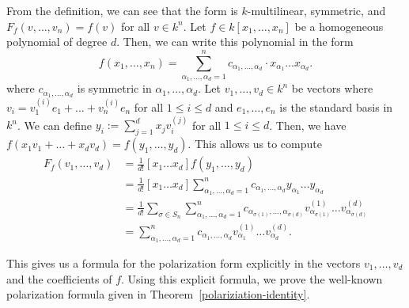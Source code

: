 \documentclass{puthesis-UG}
\begin{document}
From the definition, we can see that the form is $k$-multilinear, symmetric, and $F_f(v, \ldots, v_n) = f(v)$ for all $v \in k^n$. Let $f \in k[x_1, \ldots, x_n]$ be a homogeneous polynomial of degree $d$. Then, we can write this polynomial in the form 
\[
	f(x_1, \ldots, x_n) = \sum_{\alpha_1, \ldots, \alpha_d = 1}^n c_{\alpha_1, \ldots, \alpha_d} \cdot x_{\alpha_1} \ldots x_{\alpha_d}.
\]
where $c_{\alpha_1, \ldots, \alpha_d}$ is symmetric in $\alpha_1, \ldots, \alpha_d$. Let $v_1, \ldots, v_d\in k^n$ be vectors where $v_i = v_1^{(i)} e_1 + \ldots + v_n^{(i)} e_n$ for all $1 \leq i \leq d$ and $e_1, \ldots, e_n$ is the standard basis in $k^n$. We can define $y_i := \sum_{j = 1}^d x_j v_i^{(j)}$ for all $1 \leq i \leq d$. Then, we have $f(x_1 v_1 + \ldots + x_d v_d) = f(y_1, \ldots, y_d)$. This allows us to compute
\begin{align*}
	F_f(v_1, \ldots, v_d) & = \frac{1}{d!}[x_1 \ldots x_d] f(y_1, \ldots, y_d) \\
	& = \frac{1}{d!} [x_1 \ldots x_d] \sum_{\alpha_1, \ldots, \alpha_d = 1}^n c_{\alpha_1, \ldots, \alpha_d} y_{\alpha_1} \ldots y_{\alpha_d} \\
	& = \frac{1}{d!} \sum_{\sigma \in S_n} \sum_{\alpha_1, \ldots, \alpha_d = 1}^n c_{\alpha_{\sigma(1)}, \ldots, \alpha_{\sigma(d)}} v_{\alpha_{\sigma(1)}}^{(1)} \ldots v_{\alpha_{\sigma(d)}}^{(d)} \\
	& = \sum_{\alpha_1, \ldots, \alpha_d = 1}^n c_{\alpha_1, \ldots, \alpha_d} v_{\alpha_1}^{(1)} \ldots v_{\alpha_d}^{(d)}.
\end{align*}

This gives us a formula for the polarization form explicitly in the vectors $v_1, \ldots, v_d$ and the coefficients of $f$. Using this explicit formula, we prove the well-known polarization formula given in Theorem~\ref{polariziation-identity}.
\end{document}
